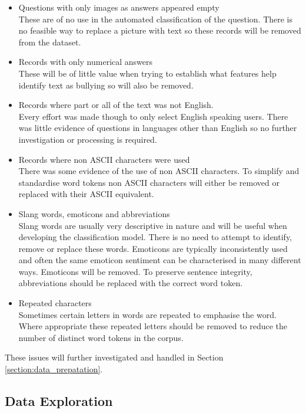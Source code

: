 \begin{itemize}

	\item Questions with only images as answers appeared empty \\
	These are of no use in the automated classification of the question. There is no feasible way to replace a picture with text so these records will be removed from the dataset.
	\item Records with only numerical answers \\
	These will be of little value when trying to establish what features help identify text as bullying so will also be removed. 
	\item Records where part or all of the text was not English. \\
	Every effort was made though to only select English speaking users. There was little evidence of questions in languages other than English so no further investigation or processing is required.
	\item Records where non ASCII characters were used \\
	There was some evidence of the use of non ASCII characters. To simplify and standardise word tokens non ASCII characters will either be removed or replaced with their ASCII equivalent.
	\item Slang words, emoticons and abbreviations \\
	Slang words are usually very descriptive in nature and will be useful when developing the classification model. There is no need to attempt to identify, remove or replace these words. Emoticons are typically inconsistently used and often the same emoticon sentiment can be characterised in many different ways. Emoticons will be removed. To preserve sentence integrity, abbreviations should be replaced with the correct word token.
	\item Repeated characters \\
	Sometimes certain letters in words are repeated to emphasise the word. Where appropriate these repeated letters should be removed to reduce the number of distinct word tokens in the corpus.
	
\end{itemize}

These issues will further investigated and handled in Section \ref{section:data_prepatation}.

\subsection{Data Exploration}

